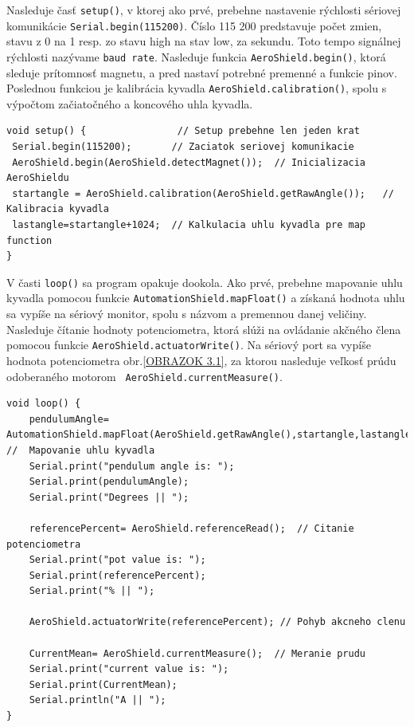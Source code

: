 Nasleduje časť \verb|setup()|, v ktorej ako prvé, prebehne nastavenie rýchlosti sériovej komunikácie \verb|Serial.begin(115200)|. Číslo 115 200 predstavuje počet zmien, stavu z 0 na 1 resp. zo stavu high na stav low, za sekundu. Toto tempo signálnej rýchlosti nazývame \verb|baud rate|. Nasleduje funkcia \verb|AeroShield.begin()|, ktorá sleduje prítomnosť magnetu, a pred nastaví potrebné premenné a funkcie pinov. Poslednou funkciou je kalibrácia kyvadla \verb|AeroShield.calibration()|, spolu s výpočtom začiatočného a koncového uhla kyvadla. 

\begin{lstlisting}[caption={AeroShield open loop setup().},captionpos=b]
void setup() {                // Setup prebehne len jeden krat 
 Serial.begin(115200);       // Zaciatok seriovej komunikacie 
 AeroShield.begin(AeroShield.detectMagnet());  // Inicializacia AeroShieldu 
 startangle = AeroShield.calibration(AeroShield.getRawAngle());   // Kalibracia kyvadla
 lastangle=startangle+1024;  // Kalkulacia uhlu kyvadla pre map function
}
\end{lstlisting}

V časti \verb|loop()| sa program opakuje dookola. Ako prvé, prebehne mapovanie uhlu kyvadla pomocou funkcie \verb|AutomationShield.mapFloat()| a získaná hodnota uhlu sa vypíše na sériový monitor, spolu s názvom a premennou danej veličiny. Nasleduje čítanie hodnoty potenciometra, ktorá slúži na ovládanie akčného člena pomocou funkcie \verb|AeroShield.actuatorWrite()|. Na sériový port sa vypíše hodnota potenciometra obr.\ref{OBRAZOK 3.1}, za ktorou nasleduje veľkosť prúdu odoberaného motorom \verb| AeroShield.currentMeasure()|. 

\begin{lstlisting}[caption={AeroShield open loop loop().},captionpos=b]
void loop() {
	pendulumAngle= AutomationShield.mapFloat(AeroShield.getRawAngle(),startangle,lastangle,0.00,90.00);    //  Mapovanie uhlu kyvadla 
	Serial.print("pendulum angle is: ");
	Serial.print(pendulumAngle);    
	Serial.print("Degrees || ");
	
	referencePercent= AeroShield.referenceRead();  // Citanie potenciometra
	Serial.print("pot value is: ");
	Serial.print(referencePercent);  
	Serial.print("% || ");
	
	AeroShield.actuatorWrite(referencePercent); // Pohyb akcneho clenu
	
	CurrentMean= AeroShield.currentMeasure();  // Meranie prudu
	Serial.print("current value is: ");
	Serial.print(CurrentMean);   
	Serial.println("A || ");
}
\end{lstlisting}

